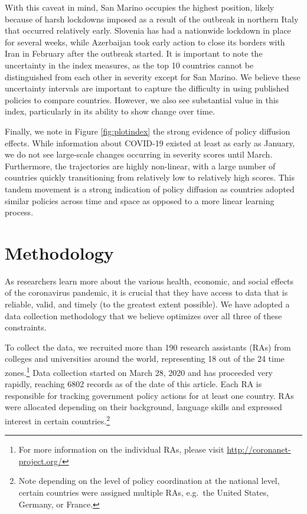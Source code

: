 \documentclass[]{article}
\let\rmarkdownfootnote\footnote%
\def\footnote{\protect\rmarkdownfootnote}
\begin{document}
With this caveat in mind, San Marino occupies the highest position, likely because of harsh lockdowns imposed as a result of the outbreak in northern Italy that occurred relatively early. Slovenia has had a nationwide lockdown in place for several weeks, while Azerbaijan took early action to close its borders with Iran in February after the outbreak started. It is important to note the uncertainty in the index measures, as the top 10 countries cannot be distinguished from each other in severity except for San Marino. We believe these uncertainty intervals are important to capture the difficulty in using published policies to compare countries. However, we also see substantial value in this index, particularly in its ability to show change over time.

Finally, we note in Figure \ref{fig:plotindex} the strong evidence of policy diffusion effects. While information about COVID-19 existed at least as early as January, we do not see large-scale changes occurring in severity scores until March. Furthermore, the trajectories are highly non-linear, with a large number of countries quickly transitioning from relatively low to relatively high scores. This tandem movement is a strong indication of policy diffusion as countries adopted similar policies across time and space as opposed to a more linear learning process.

\hypertarget{methodology}{%
\section{Methodology}\label{methodology}}

As researchers learn more about the various health, economic, and social effects of the coronavirus pandemic, it is crucial that they have access to data that is reliable, valid, and timely (to the greatest extent possible). We have adopted a data collection methodology that we believe optimizes over all three of these constraints.

To collect the data, we recruited more than 190 research assistants (RAs) from colleges and universities around the world, representing 18 out of the 24 time zones.\footnote{For more information on the individual RAs, please visit \url{http://coronanet-project.org/}} Data collection started on March 28, 2020 and has proceeded very rapidly, reaching 6802 records as of the date of this article. Each RA is responsible for tracking government policy actions for at least one country. RAs were allocated depending on their background, language skills and expressed interest in certain countries.\footnote{Note depending on the level of policy coordination at the national level, certain countries were assigned multiple RAs, e.g.~the United States, Germany, or France.}
\end{document}
